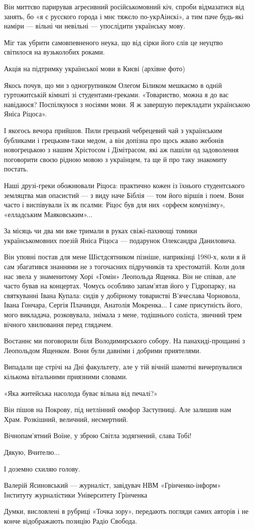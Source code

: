Він миттєво парирував агресивний російськомовний кіч, спроби відмазатися від
занять, бо «я с русского города і мнє тяжєло по-укрАінскі», а тим паче будь-які
наміри --- вільні чи невільні --- упослідити українську мову.

Міг так убрити самовпевненого неука, що від сірки його слів це неуцтво
світилося на вузьколобих роками.

 Акція на підтримку української мови в Києві (архівне фото)

Якось почув, що ми з одногрупником Олегом Біликом мешкаємо в одній
гуртожитській кімнаті зі студентами-греками. «Товариство, можна я до вас
навідаюся? Поспілкуюся з носіями мови. Я ж завершую перекладати українською
Яніса Ріцоса».

І якогось вечора прийшов. Пили грецький чебрецевий чай з українським бубликами
і грецьким-таки медом, а він допізна про щось жваво жебонів новогрецькою з
нашим Хрістосом і Дімітрасом, які аж пашіли од задоволення поговорити своєю
рідною мовою з українцем, та ще й про таку знакомиту постать.

Наші друзі-греки обожнювали Ріцоса: практично кожен із їхнього студентського
земляцтва мав опасистий --- з виду наче Біблія --- том його віршів і поем. Вони
часто і виспівували їх як псалми: Ріцос був для них «орфеєм комунізму»,
«елладським Маяковським»...

За місяць чи два ми вже тримали в руках свіжі-пахнющі томики українськомовних
поезій Яніса Ріцоса --- подарунок Олександра Даниловича. 

Він уповні постав для мене Шістдсятником пізніше, наприкінці 1980-х, коли я й
сам збагатився знаннями не з тогочасних підручників та хрестоматій. Коли доля
нас звела у знаменитому Хорі «Гомін» Леопольда Ященка. Він не співав, але часто
бував на концертах. Чомусь особливо запам'ятав його у Гідропарку, на
святкуванні Івана Купала: сидів у добірному товаристві В'ячеслава Чорновола,
Івана Гончара, Сергія Плачинди, Анатолія Мокренка... І саме присутність його,
мого викладача, розковувала, знімала з мене, тодішнього соліста, звичний трем
вічного хвилювання перед глядачем. 

Востаннє ми поговорили біля Володимирського собору. На панахиді-прощанні з
Леопольдом Ященком. Вони були давніми і добрими приятелями.

Випадали ще стрічі на Дні факультету, але у тій вічній шамотні вичерпувалися
кількома вітальними приязними словами.

«Яка житейська насолода буває вільна від печалі?»

Він пішов на Покрову, під нетлінний омофор Заступниці. Але залишив нам Храм.
Розкішний, величний, несмертний.

Вічнопам'ятний Воїне, у зброю Світла зодягнений, слава Тобі!

Дякую, Вчителю...

І доземно схиляю голову. 

Валерій Ясиновський --- журналіст, завідувач НВМ «Грінченко-інформ» Інституту
журналістики Університету Грінченка

Думки, висловлені в рубриці «Точка зору», передають погляди самих авторів і не
конче відображають позицію Радіо Свобода.
